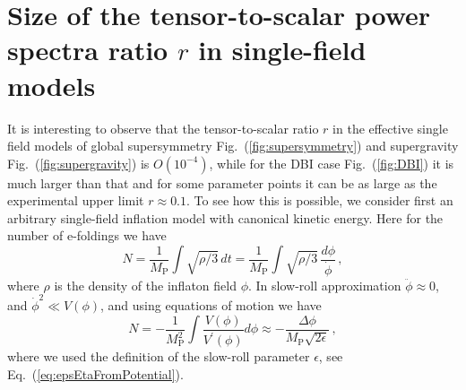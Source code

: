 \documentclass[11pt]{article}
\begin{document}
\section{Size of the tensor-to-scalar power spectra ratio $r$ in single-field models \label{sec:r}}
It is interesting to observe that the tensor-to-scalar ratio $r$ in the effective single field models of global supersymmetry Fig.~(\ref{fig:supersymmetry}) and supergravity Fig.~(\ref{fig:supergravity}) is $O\left(10^{-4}\right)$, while for the DBI case Fig.~(\ref{fig:DBI}) it is much larger than that and for some parameter points it can be as large as the experimental upper limit $r \approx 0.1$.
To see how this is possible, we consider first an arbitrary single-field inflation model with canonical kinetic energy.
Here for the number of e-foldings we have
\begin{equation} \label{eq:efoldingsGeneral}
  N = \frac{1}{M_\text{P}} \int \sqrt{\rho / 3}\,dt
    = \frac{1}{M_\text{P}} \int \sqrt{\rho / 3}\,\frac{d\phi}{\dot \phi}\,,
\end{equation}
where $\rho$ is the density of the inflaton field $\phi$.
In slow-roll approximation $\ddot \phi \approx 0$, and ${\dot \phi}^2 \ll V\left(\phi\right)$, and using equations of motion we have
\begin{equation} \label{eq:efoldingsCanonical}
  N = - \frac{1}{M_\text{P}^2} \int \frac{V\left(\phi\right)}{V^\prime\left(\phi\right)} d\phi
    \approx - \frac{\Delta \phi}{M_\text{P} \sqrt{2 \epsilon}}\,,
\end{equation}
where we used the definition of the slow-roll parameter $\epsilon$, see Eq.~(\ref{eq:epsEtaFromPotential}).
\end{document}
